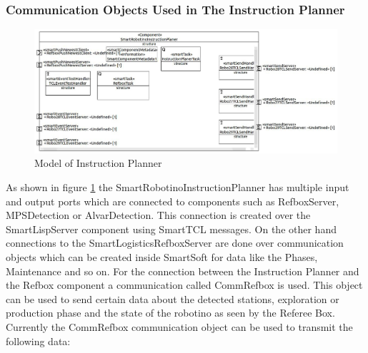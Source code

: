 \subsubsection{Communication Objects Used in The Instruction Planner}


\begin{figure}[h]
\centering
\includegraphics[scale=0.25]{pic/SmartRobotinoInstructionPlaner.JPG}
\caption{Model of Instruction Planner}
\label{fig:i_overview}
\end{figure}


As shown in figure \ref{fig:i_overview} the SmartRobotinoInstructionPlanner has multiple input and output ports which are connected to components such as RefboxServer, MPSDetection or AlvarDetection. This connection is created over the SmartLispServer component using SmartTCL messages. On the other hand connections to the SmartLogisticsRefboxServer are done over communication objects which can be created inside SmartSoft for data like the Phases, Maintenance and so on. For the connection between the Instruction Planner and the Refbox component a communication called CommRefbox is used. This object can be used to send certain data about the detected stations, exploration or production phase and the state of the robotino as seen by the 
Referee Box. \\

Currently the CommRefbox communication object can be used to transmit the following data: 

